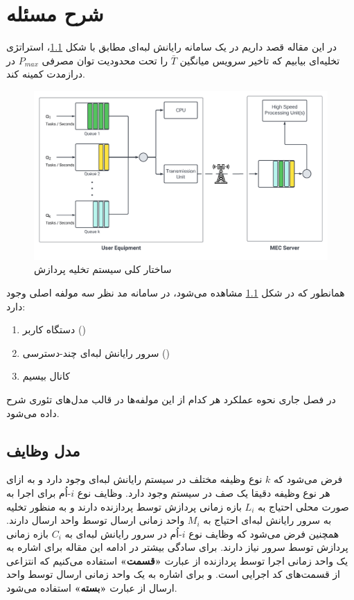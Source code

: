 \chapter{شرح مسئله}
در این مقاله قصد داریم در یک سامانه رایانش لبه‌ای مطابق با شکل \ref{fig-offloading-system}، استراتژی تخلیه‌ای بیابیم که تاخیر سرویس میانگین $\bar{T}$ را تحت محدودیت توان مصرفی $P_{m a x}$ در درازمدت کمینه کند.
\begin{figure}[H]
	\centering
	\includegraphics*[width=\textwidth]{figures/MEC5.png}
	\caption{ساختار کلی سیستم تخلیه پردازش}
	\label{fig-offloading-system}
\end{figure}
\newpage
همانطور که در شکل \ref{fig-offloading-system} مشاهده می‌شود، در سامانه مد نظر سه مولفه اصلی وجود دارد:
\begin{enumerate}
	\item دستگاه کاربر ()
	\item سرور رایانش لبه‌ای چند-دسترسی ()
	\item کانال بیسیم
\end{enumerate}
در فصل جاری نحوه عملکرد هر کدام از این مولفه‌ها در قالب مدل‌های تئوری شرح داده می‌شود.

\section{مدل وظایف}
فرض می‌شود که \(k\) نوع وظیفه مختلف در سیستم رایانش لبه‌ای وجود دارد و به ازای هر نوع وظیفه دقیقا یک صف در سیستم وجود دارد. وظایف نوع \(i\)-اُم برای اجرا به صورت محلی احتیاج به \(L_i\) بازه زمانی پردازش توسط پردازنده دارند و به منظور تخلیه به سرور رایانش لبه‌ای احتیاج به \(M_i\) واحد زمانی ارسال توسط واحد ارسال دارند. همچنین فرض می‌شود که وظایف نوع \(i\)-اُم در سرور رایانش لبه‌ای به \(C_i\) بازه زمانی پردازش توسط سرور نیاز دارند. برای سادگی بیشتر در ادامه این مقاله برای اشاره به یک واحد زمانی اجرا توسط پردازنده از عبارت \textbf{«قسمت»} استفاده می‌کنیم که انتزاعی از قسمت‌های کد اجرایی است. و برای اشاره به یک واحد زمانی ارسال توسط واحد ارسال از عبارت\textbf{ «بسته» }استفاده می‌شود.
\newpage
